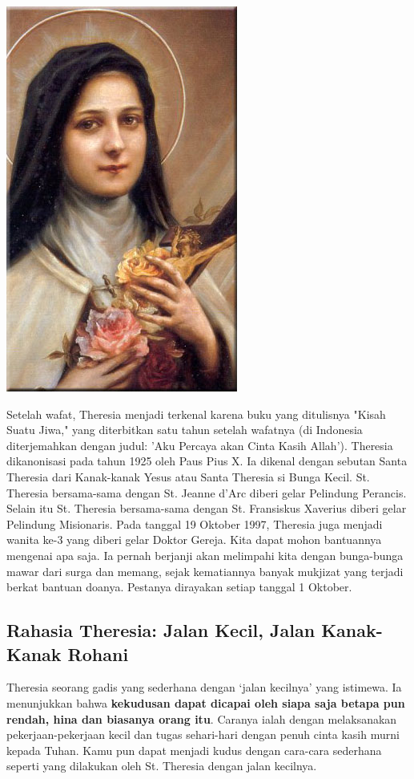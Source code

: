 \begin{floatingfigure}[l]{2.75cm}
	\begin{center}
		\includegraphics[scale=0.275]{theresia-3.jpg}
	\end{center}
\end{floatingfigure}
Setelah wafat, Theresia menjadi terkenal karena buku yang ditulisnya "Kisah Suatu Jiwa," yang diterbitkan satu tahun setelah wafatnya (di Indonesia diterjemahkan dengan judul: 'Aku Percaya akan Cinta Kasih Allah'). Theresia dikanonisasi pada tahun 1925 oleh Paus Pius X. Ia dikenal dengan sebutan Santa Theresia dari Kanak-kanak Yesus atau Santa Theresia si Bunga Kecil. St. Theresia bersama-sama dengan St. Jeanne d'Arc diberi gelar Pelindung Perancis. Selain itu St. Theresia bersama-sama dengan St. Fransiskus Xaverius diberi gelar Pelindung Misionaris.  Pada tanggal 19 Oktober 1997, Theresia juga menjadi wanita ke-3 yang diberi gelar Doktor Gereja. Kita dapat mohon bantuannya mengenai apa saja. Ia pernah berjanji  akan melimpahi kita dengan bunga-bunga mawar dari surga dan memang, sejak kematiannya banyak mukjizat yang terjadi berkat bantuan doanya. Pestanya dirayakan setiap tanggal 1 Oktober.

\subsection*{Rahasia Theresia: Jalan Kecil, Jalan Kanak-Kanak Rohani}

Theresia seorang gadis yang sederhana dengan `jalan kecilnya' yang istimewa.  Ia menunjukkan bahwa \textbf{kekudusan dapat dicapai oleh siapa saja betapa pun rendah, hina dan biasanya orang itu}. Caranya ialah dengan melaksanakan pekerjaan-pekerjaan kecil dan tugas sehari-hari dengan penuh cinta kasih murni kepada Tuhan. Kamu pun dapat menjadi kudus dengan cara-cara sederhana seperti yang dilakukan oleh St. Theresia dengan jalan kecilnya.

